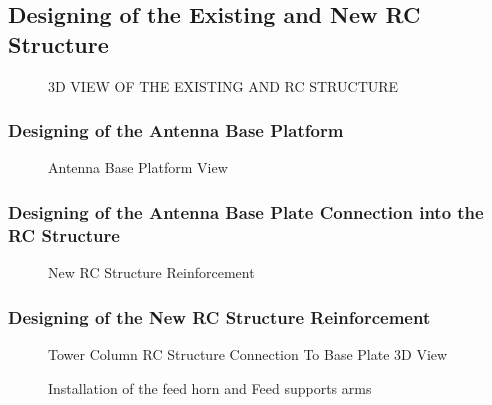 {\subsection{Designing of the Existing and New RC Structure}

\begin{figure}[htp]
\vspace*{-1cm}
\caption{3D VIEW OF THE EXISTING AND RC STRUCTURE}
\end{figure}
 
 \newpage
 
\subsubsection{Designing of the Antenna Base Platform}
\begin{figure}[htp]
\vspace*{-1cm}
    \caption{Antenna Base Platform View}
\end{figure}

\newpage
\subsubsection{Designing of the Antenna Base Plate Connection into the RC Structure}
\begin{figure}[htp]
\vspace*{-1cm}
    \caption{New RC Structure Reinforcement}
\end{figure}


\subsubsection{Designing of the New RC Structure Reinforcement}

\begin{figure}[htp]
\vspace*{-1cm}
    \caption{Tower Column RC Structure Connection To Base Plate 3D View}
\end{figure}


















 \begin{figure}[htp]
    \centering
    \caption{Installation of the feed horn and Feed supports arms}
    \label{fig:3.4}
\end{figure}
}